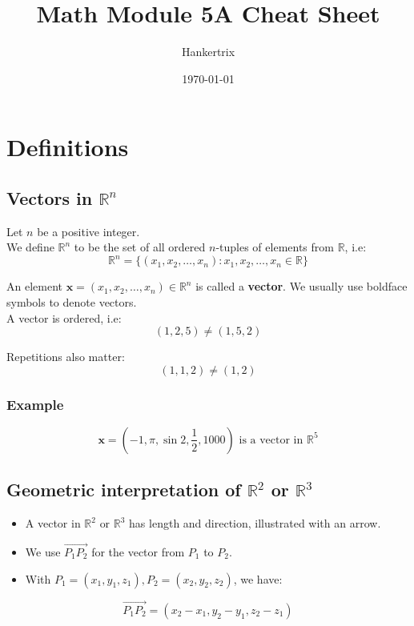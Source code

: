 \documentclass[11pt]{article}
\author{Hankertrix}
\date{\today}
\title{Math Module 5A Cheat Sheet}
\begin{document}
\maketitle
\setcounter{tocdepth}{2}
\tableofcontents

\newpage

\section{Definitions}
\label{sec:org88d5f97}

\subsection{Vectors in \(\mathbb{R}^n\)}
\label{sec:org8e31e75}
Let \(n\) be a positive integer.
\\[0pt]

We define \(\mathbb{R}^n\) to be the set of all ordered \(n\)-tuples of elements from \(\mathbb{R}\), i.e:
\[\mathbb{R}^n = \{(x_1, x_2, \ldots, x_n): x_1, x_2, \ldots, x_n \in \mathbb{R}\}\]

An element \(\boldsymbol{x} = (x_1, x_2, \ldots, x_n) \in \mathbb{R}^n\) is called a \textbf{vector}. We usually use boldface symbols to denote vectors.
\\[0pt]

A vector is ordered, i.e:
\[(1, 2, 5) \ne (1, 5, 2)\]

Repetitions also matter:
\[(1, 1, 2) \ne (1, 2)\]

\subsubsection{Example}
\label{sec:org38fc266}
\[\boldsymbol{x} = (-1, \pi, \sin 2, \frac{1}{2}, 1000) \text{ is a vector in } \mathbb{R}^5\]

\subsection{Geometric interpretation of \(\mathbb{R}^2\) or \(\mathbb{R}^3\)}
\label{sec:org870adba}
\begin{itemize}
\item A vector in \(\mathbb{R}^2 \text{ or } \mathbb{R}^3\) has length and direction, illustrated with an arrow.
\item We use \(\overrightarrow{P_1 P_2}\) for the vector from \(P_1\) to \(P_2\).
\item With \(P_1 = (x_1, y_1, z_1), P_2 = (x_2, y_2, z_2)\), we have:
\end{itemize}
\[\overrightarrow{P_1 P_2} = (x_2 - x_1, y_2 - y_1, z_2 - z_1)\]
\end{document}
